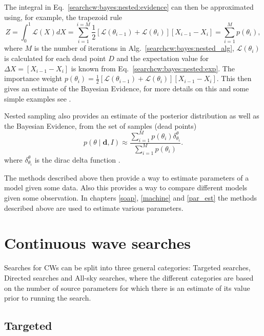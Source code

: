 The integral in Eq.~\ref{searchcw:bayes:nested:evidence} can then be approximated using, for example, the trapezoid rule
\begin{equation}
	Z = \int_0^1 \mathcal{L}(X) dX = \sum_{i=1}^{i=M} \frac{1}{2} \left[ \mathcal{L}(\theta_{i-1}) + \mathcal{L}(\theta_i)\right] \left[ X_{i-1} - X_{i} \right] = \sum_{i=1}^{M} p(\theta_i),
\end{equation}
where $M$ is the number of iterations in Alg.~\ref{searchcw:bayes:nested_alg}, $\mathcal{L}(\theta_i)$ is calculated for each dead point $D$ and the expectation value for $\Delta X = \left[ X_{i-1} - X_{i} \right]$ is known from Eq.~\ref{searchcw:bayes:nested:exp}. The importance weight $p(\theta_i) = \frac{1}{2} \left[ \mathcal{L}(\theta_{i-1}) + \mathcal{L}(\theta_i)\right] \left[ X_{i-1} - X_{i} \right]$.
This then gives an estimate of the Bayesian Evidence, for more details on this and some simple examples see \citep{skilling2006NestedSampling}.

Nested sampling also provides an estimate of the posterior distribution as well as the Bayesian Evidence, from the set of samples (dead points) 
\begin{equation}
	p(\theta \mid \bm{d}, I) \approx \frac{\sum_{i=1}^{M} p(\theta_i) \delta^{\theta}_{\theta_i}}{\sum_{i=1}^{M} p(\theta_i) }.
\end{equation}
where $\delta^{\theta}_{\theta_i}$ is the dirac delta function \citep{speagle2019DynestyDynamic}.


The methods described above then provide a way to estimate parameters of a
model given some data.  Also this provides a way to compare different models
given some observation.  In chapters \ref{soap}, \ref{machine} and \ref{par_est} the methods
described above are used to estimate various parameters.

\clearpage
\section{\label{searchcw:search} Continuous wave searches}

Searches for \glspl{CW} can be split into three general categories: Targeted
searches, Directed searches and All-sky searches, where the different
categories are based on the number of source parameters for which there is an estimate of its value prior to running the search.

\subsection{\label{searchcw:search:targeted}Targeted}

